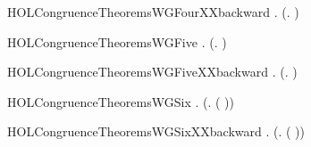 \newcommand{\HOLCongruenceTheoremsWGFour}{\UseVerbatim{HOLCongruenceTheoremsWGFour}}
\begin{SaveVerbatim}{HOLCongruenceTheoremsWGFourXXbackward}
\HOLTokenTurnstile{} \HOLSymConst{\HOLTokenForall{}} .  (\HOLTokenLambda{}.   \HOLSymConst{\ensuremath{+}}  ) \HOLSymConst{\HOLTokenImp{}}   \HOLSymConst{\HOLTokenConj{}}  
\end{SaveVerbatim}
\newcommand{\HOLCongruenceTheoremsWGFourXXbackward}{\UseVerbatim{HOLCongruenceTheoremsWGFourXXbackward}}
\begin{SaveVerbatim}{HOLCongruenceTheoremsWGFive}
\HOLTokenTurnstile{} \HOLSymConst{\HOLTokenForall{}} .   \HOLSymConst{\HOLTokenConj{}}   \HOLSymConst{\HOLTokenImp{}}  (\HOLTokenLambda{}.   \HOLSymConst{\ensuremath{\parallel}}  )
\end{SaveVerbatim}
\newcommand{\HOLCongruenceTheoremsWGFive}{\UseVerbatim{HOLCongruenceTheoremsWGFive}}
\begin{SaveVerbatim}{HOLCongruenceTheoremsWGFiveXXbackward}
\HOLTokenTurnstile{} \HOLSymConst{\HOLTokenForall{}} .  (\HOLTokenLambda{}.   \HOLSymConst{\ensuremath{\parallel}}  ) \HOLSymConst{\HOLTokenImp{}}   \HOLSymConst{\HOLTokenConj{}}  
\end{SaveVerbatim}
\newcommand{\HOLCongruenceTheoremsWGFiveXXbackward}{\UseVerbatim{HOLCongruenceTheoremsWGFiveXXbackward}}
\begin{SaveVerbatim}{HOLCongruenceTheoremsWGSix}
\HOLTokenTurnstile{} \HOLSymConst{\HOLTokenForall{}} .   \HOLSymConst{\HOLTokenImp{}}  (\HOLTokenLambda{}. \HOLConst{\ensuremath{\nu}}  ( ))
\end{SaveVerbatim}
\newcommand{\HOLCongruenceTheoremsWGSix}{\UseVerbatim{HOLCongruenceTheoremsWGSix}}
\begin{SaveVerbatim}{HOLCongruenceTheoremsWGSixXXbackward}
\HOLTokenTurnstile{} \HOLSymConst{\HOLTokenForall{}} .  (\HOLTokenLambda{}. \HOLConst{\ensuremath{\nu}}  ( )) \HOLSymConst{\HOLTokenImp{}}  
\end{SaveVerbatim}
